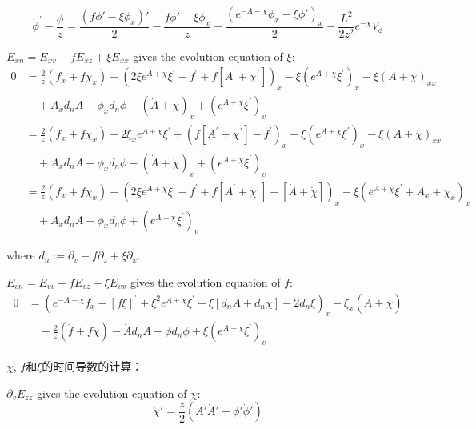\documentclass[12pt,a4paper]{ctexart}
\numberwithin{equation}{section}
\begin{document}
\begin{equation}
    \dot{\phi}^{\prime}-\frac{\dot{\phi}}{z}=\frac{(f\phi'-\xi\phi_{x})'}{2}-\frac{f\phi'-\xi\phi_{x}}{z}+\frac{(e^{-A-\chi}\phi_{x}-\xi\phi')_{x}}{2}-\frac{L^{2}}{2z^{2}}e^{-\chi}V_\phi
\end{equation}

$E_{xn}=E_{xv}-fE_{xz}+\xi E_{xx}$ gives the evolution equation of $\xi$:
\begin{equation}
    \begin{aligned}
        0&=\frac{2}{z}(f_{x}+f\chi_{x})+(2\xi e^{A+\chi}\xi^{\prime}-f^{\prime}+f[A^{\prime}+\chi^{\prime}])_{x}-\xi(e^{A+\chi}\xi^{\prime})_{x}-\xi(A+\chi)_{xx}\\
        &\quad+A_{x}d_{n}A+\phi_{x}d_n\phi-(\dot{A}+\dot{\chi})_{x}+(e^{A+\chi}\xi^{\prime})_{v}\\
        &=\frac{2}{z}(f_{x}+f\chi_{x})+2\xi_{x}e^{A+\chi}\xi^{\prime}+(f[A^{\prime}+\chi^{\prime}]-f^{\prime})_{x}+\xi(e^{A+\chi}\xi^{\prime})_{x}-\xi(A+\chi)_{xx}\\
        &\quad+A_{x}d_{n}A+\phi_{x}d_n\phi-(\dot{A}+\dot{\chi})_{x}+(e^{A+\chi}\xi^{\prime})_{v}\\
        &=\frac{2}{z}(f_{x}+f\chi_{x})+(2\xi e^{A+\chi}\xi^{\prime}-f^{\prime}+f[A^{\prime}+\chi^{\prime}]-[\dot{A}+\dot{\chi}])_{x}-\xi(e^{A+\chi}\xi^{\prime}+A_x+\chi_x)_{x}\\
        &\quad+A_{x}d_{n}A+\phi_{x}d_n\phi+(e^{A+\chi}\xi^{\prime})_{v}
    \end{aligned}
\end{equation}

where $d_{n}:=\partial_{v}-f\partial_{z}+\xi\partial_{x}$.

$E_{vn}=E_{vv}-fE_{vz}+\xi E_{vx}$ gives the evolution equation of $f$:
\begin{equation}
    \begin{aligned}
        0&=(e^{-A-\chi}f_{x}-[f\xi]^{\prime}+\xi^{2}e^{A+\chi}\xi^{\prime}-\xi[d_{n}A+d_{n}\chi]-2d_{n}\xi)_{x}-\xi_x(\dot{A}+\dot{\chi})\\
        &\quad-\frac{2}{z}(\dot{f}+f\dot{\chi})-\dot{A}d_{n}A-\dot{\phi}d_n\phi+\xi(e^{A+\chi}\xi^{\prime})_{v}
    \end{aligned}
\end{equation}

$\chi$, $f$和$\xi$的时间导数的计算：

$\partial_v E_{zz}$ gives the evolution equation of $\chi$:
\begin{equation}
    \dot{\chi}'=\frac{z}{2}(A'\dot{A}'+\phi'\dot{\phi}')
\end{equation}
\end{document}
